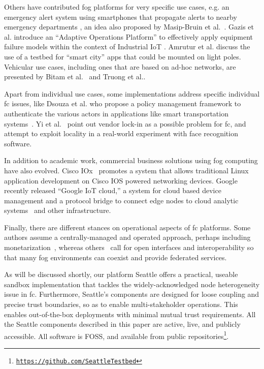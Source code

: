 Others have contributed fog platforms for very specific use cases, e.g.
an emergency alert system using smartphones that propagate alerts to nearby
emergency departments \cite{7134091}, an idea also proposed by Masip-Bruin
et al.~\cite{masip-bruin_foggy_2016}. Gazis et al. introduce an ``Adaptive
Operations Platform''
to effectively apply equipment failure models within the context of Industrial
\gls{IoT} \cite{gazis_components_2015}.
Amrutur et al.\cite{amrutur_open_2017} discuss the use of
a testbed for ``smart city'' apps that could be mounted on
light poles. Vehicular use cases, including ones that are based on
ad-hoc networks, are presented by Bitam et al.~\cite{bitam_vanet-cloud:_2015}
and Truong et al.\cite{truong_software_2015}.

Apart from individual use cases, some implementations address specific individual
\gls{fc} issues, like Dsouza et al. who propose a policy management framework
to authenticate the various actors in applications
like smart transportation systems~\cite{dsouza_policy-driven_2014}.
Yi et al.~\cite{yi_fog_2015} point out vendor lock-in
as a possible problem for \gls{fc}, and attempt to exploit locality
in a real-world experiment with face recognition software.

In addition to academic work, commercial business solutions using fog computing
have also evolved.
Cisco IOx~\cite{cisco_iox} promotes a
system that allows traditional Linux application development on
Cisco IOS powered networking devices.
Google recently released ``Google \gls{IoT} cloud,'' a system for
cloud based device management and a protocol bridge to connect edge nodes to
cloud analytic systems~\cite{google_iot_core} and other infrastructure.

Finally, there are different stances on operational aspects of
\gls{fc} platforms. Some authors assume a centrally-managed and
operated approach, perhaps including monetarization~\cite{mahmud_fog_2016,7868354}, whereas others~\cite{belli_design_2015}
call for open interfaces and interoperability so that many
fog environments can coexist and provide federated services.

As will be discussed shortly, our platform Seattle offers a practical,
useable sandbox implementation that tackles the widely-acknowledged
node heterogeneity issue in \gls{fc}. Furthermore, Seattle's components
are designed for loose coupling and precise trust boundaries, so as to
enable multi-stakeholder operations. This enables out-of-the-box
deployments with minimal mutual trust requirements.
All the Seattle components described in this paper are active, live, and
publicly accessible. All software is
\acrlong{FOSS}, and available from public
repositories\footnote{\texttt{\url{https://github.com/SeattleTestbed}}}.


